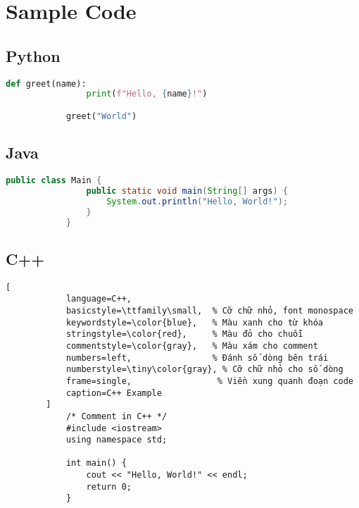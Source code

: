 \chapter{Sample Code}
    \section{Python}
        \begin{lstlisting}[language=Python, caption=Python Example]
            def greet(name):
                print(f"Hello, {name}!")

            greet("World")
        \end{lstlisting}

    \section{Java}
        \begin{lstlisting}[language=Java, caption=Java Example]
            public class Main {
                public static void main(String[] args) {
                    System.out.println("Hello, World!");
                }
            }
        \end{lstlisting}

    \section{C++}
        \begin{lstlisting}[
            language=C++,
            basicstyle=\ttfamily\small,  % Cỡ chữ nhỏ, font monospace
            keywordstyle=\color{blue},   % Màu xanh cho từ khóa
            stringstyle=\color{red},     % Màu đỏ cho chuỗi
            commentstyle=\color{gray},   % Màu xám cho comment
            numbers=left,                % Đánh số dòng bên trái
            numberstyle=\tiny\color{gray}, % Cỡ chữ nhỏ cho số dòng
            frame=single,                 % Viền xung quanh đoạn code
            caption=C++ Example
        ]
            /* Comment in C++ */
            #include <iostream>
            using namespace std;
            
            int main() {
                cout << "Hello, World!" << endl;
                return 0;
            }
        \end{lstlisting}